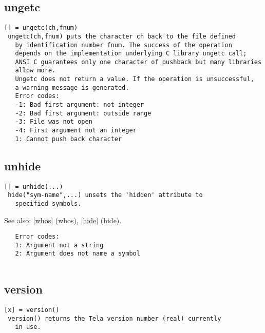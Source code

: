 \documentclass[a4paper]{article}
\begin{document}
\subsection{ungetc\label{ungetc}}

\begin{tscreen}
\begin{verbatim}
[] = ungetc(ch,fnum)
 ungetc(ch,fnum) puts the character ch back to the file defined
   by identification number fnum. The success of the operation
   depends on the implementation underlying C library ungetc call;
   ANSI C guarantees only one character of pushback but many libraries
   allow more.
   Ungetc does not return a value. If the operation is unsuccessful,
   a warning message is generated.
   Error codes:
   -1: Bad first argument: not integer
   -2: Bad first argument: outside range
   -3: File was not open
   -4: First argument not an integer
   1: Cannot push back character
\end{verbatim}
\end{tscreen}





\subsection{unhide\label{unhide}}

\begin{tscreen}
\begin{verbatim}
[] = unhide(...)
 hide("sym-name",...) unsets the 'hidden' attribute to
   specified symbols.
\end{verbatim}

See also: \ref{whos} {(whos)}, \ref{hide} {(hide)}.
\begin{verbatim}
   Error codes:
   1: Argument not a string
   2: Argument does not name a symbol
   
\end{verbatim}
\end{tscreen}





\subsection{version\label{version}}

\begin{tscreen}
\begin{verbatim}
[x] = version()
 version() returns the Tela version number (real) currently
   in use. 
\end{verbatim}
\end{tscreen}
\end{document}
